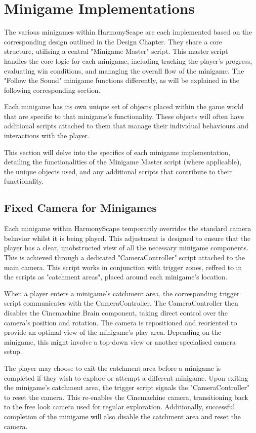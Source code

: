 \documentclass{l4proj}
\begin{document}
\section{Minigame Implementations}
The various minigames within HarmonyScape are each implemented based on the corresponding design outlined in the Design Chapter. They share a core structure, utilising a central "Minigame Master" script. This master script handles the core logic for each minigame, including tracking the player's progress, evaluating win conditions, and managing the overall flow of the minigame. The "Follow the Sound" minigame functions differently, as will be explained in the following corresponding section. 

Each minigame has its own unique set of objects placed within the game world that are specific to that minigame's functionality. These objects will often have additional scripts attached to them that manage their individual behaviours and interactions with the player.

This section will delve into the specifics of each minigame implementation, detailing the functionalities of the Minigame Master script (where applicable), the unique objects used, and any additional scripts that contribute to their functionality.

\subsection{Fixed Camera for Minigames}
Each minigame within HarmonyScape temporarily overrides the standard camera behavior whilst it is being played. This adjustment is designed to ensure that the player has a clear, unobstructed view of all the necessary minigame components. This is achieved through a dedicated "CameraController" script attached to the main camera. This script works in conjunction with trigger zones, reffred to in the scripts as "catchment areas", placed around each minigame's location.

When a player enters a minigame's catchment area, the corresponding trigger script communicates with the CameraController. The CameraController then disables the Cinemachine Brain component, taking direct control over the camera's position and rotation. The camera is repositioned and reoriented to provide an optimal view of the minigame's play area. Depending on the minigame, this might involve a top-down view or another specialised camera setup.

The player may choose to exit the catchment area before a minigame is completed if they wish to explore or attempt a different minigame. Upon exiting the minigame's catchment area, the trigger script signals the "CameraController" to reset the camera. This re-enables the Cinemachine camera, transitioning back to the free look camera used for regular exploration. Additionally, successful completion of the minigame will also disable the catchment area and reset the camera.
\end{document}

